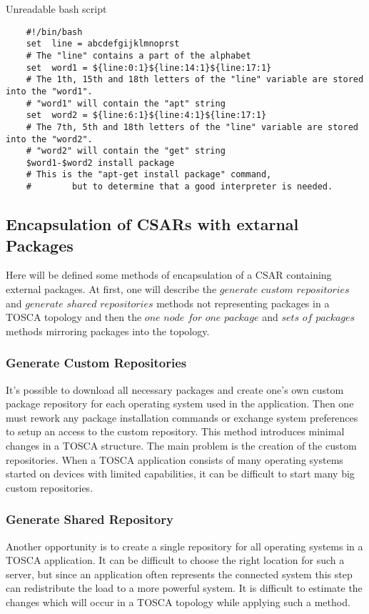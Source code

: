 \begin{Listing} 
	\caption{Unreadable bash script}
	\label{alg:unreadable}
	\begin{lstlisting}
	#!/bin/bash
	set  line = abcdefgijklmnoprst
	# The "line" contains a part of the alphabet
	set  word1 = ${line:0:1}${line:14:1}${line:17:1} 
	# The 1th, 15th and 18th letters of the "line" variable are stored into the "word1".
	# "word1" will contain the "apt" string 
	set  word2 = ${line:6:1}${line:4:1}${line:17:1}
	# The 7th, 5th and 18th letters of the "line" variable are stored into the "word2".
	# "word2" will contain the "get" string 
	$word1-$word2 install package
	# This is the "apt-get install package" command,
	#		 but to determine that a good interpreter is needed.
	\end{lstlisting}
\end{Listing}

\subsection*{Encapsulation of CSARs with extarnal Packages}\label{subs:encaps}
Here will be defined some methods of encapsulation of a CSAR containing external packages.
At first, one will describe the $generate$ $custom$ $repositories$ and $generate$ $shared$ $repositories$ methods not representing packages in a TOSCA topology and then the $one$ $node$ $for$ $one$ $package$ and $sets$ $of$ $packages$ methods mirroring packages into the topology.
\subsubsection*{Generate Custom Repositories}
It's possible to download all necessary packages and create one's own custom package repository for each operating system used in the application. 
Then one must rework any package installation commands or exchange system preferences to setup an access to the custom repository.
This method introduces minimal changes in a TOSCA structure.
The main problem is the creation of the custom repositories. 
When a TOSCA application consists of many operating systems started on devices with limited capabilities, it can be difficult to start many big custom repositories.
\subsubsection*{Generate Shared Repository}
Another opportunity is to create a single repository for all operating systems in a TOSCA application.
It can be difficult to choose the right location for such a server, but since an application often represents the connected system this step can redistribute the load to a more powerful system.
It is difficult to estimate the changes which will occur in a TOSCA topology while applying such a method.
